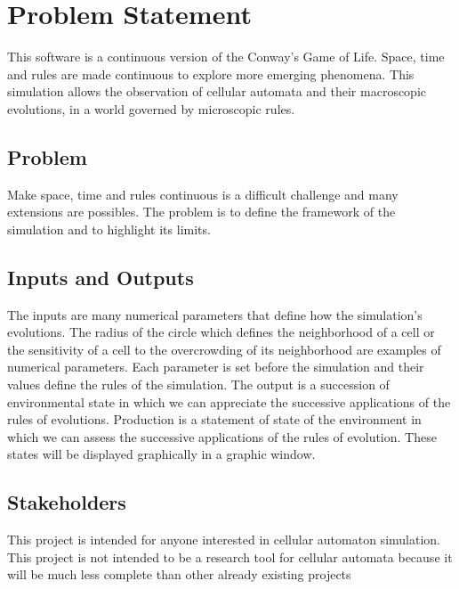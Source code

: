 \documentclass{article}
\title{\progname}
\author{\authname}
\date{01/19/2025}
\begin{document}
\maketitle

\section{Problem Statement}

This software is a continuous version of the Conway's Game of Life.
Space, time and rules are made continuous to explore more emerging phenomena.
This simulation allows the observation of cellular automata and their macroscopic evolutions, in a world governed by microscopic rules.
\subsection{Problem}

Make space, time and rules continuous is a difficult challenge and many extensions are possibles.
The problem is to define the framework of the simulation and to highlight its limits.

\subsection{Inputs and Outputs}

The inputs are many numerical parameters that define how the simulation's evolutions. The radius of the circle which defines the neighborhood of a cell or the sensitivity of a 
cell to the overcrowding of its neighborhood are examples of numerical parameters.  Each parameter is set before the simulation and their values define the rules of the simulation.
The output is a succession of environmental state in which we can appreciate the successive applications of the rules of evolutions.
Production is a statement of state of the environment in which we can assess the successive applications of the rules of evolution. 
These states will be displayed graphically in a graphic window.

\subsection{Stakeholders}

This project is intended for anyone interested in cellular automaton simulation.
This project is not intended to be a research tool for cellular automata because 
it will be much less complete than other already existing projects
\end{document}
